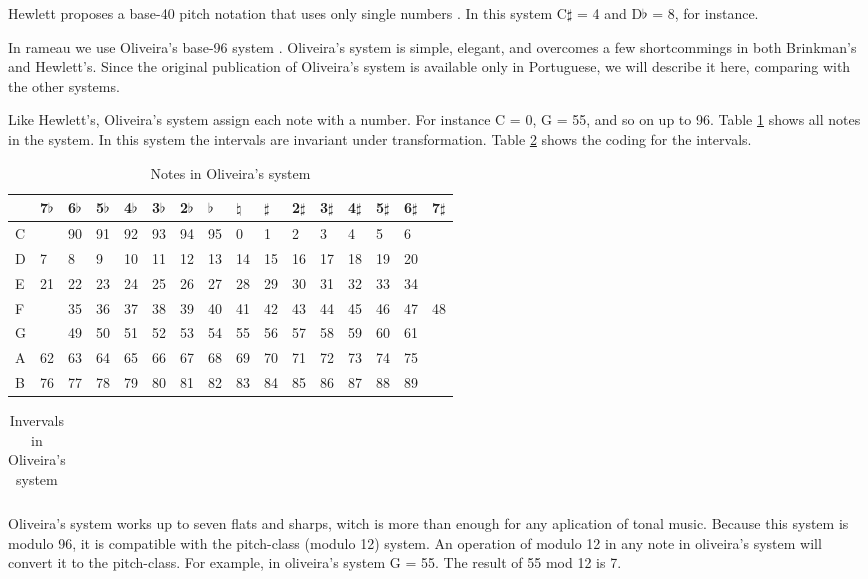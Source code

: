 \documentclass{article}
\begin{document}
Hewlett proposes a base-40 pitch notation that uses only single
numbers \cite{hewlett92:base40}. In this system C$\sharp$ = 4 and
D$\flat$ = 8, for instance.

In rameau we use Oliveira's base-96 system
\cite{oliveira01:codificacao}. Oliveira's system is simple, elegant,
and overcomes a few shortcommings in both Brinkman's and Hewlett's.
Since the original publication of Oliveira's system is available only
in Portuguese, we will describe it here, comparing with the other
systems.

Like Hewlett's, Oliveira's system assign each note with a number. For
instance C = 0, G = 55, and so on up to 96. Table
\ref{tab:jama-notas} shows all notes in the system. In this system the
intervals are invariant under transformation. Table
\ref{tab:jama-intervalos} shows the coding for the intervals.

\begin{table}
  \centering
  \begin{tabular}{l|lllllllllllllll}
    & 7$\flat$ & 6$\flat$ & 5$\flat$ & 4$\flat$ & 3$\flat$ & 2$\flat$ &
    $\flat$ & 
    $\natural$ & $\sharp$ & 2$\sharp$ & 3$\sharp$ & 4$\sharp$ &
    5$\sharp$ & 6$\sharp$ & 7$\sharp$ \\
    \hline
    C &   &90&91&92&93&94&95& 0& 1& 2& 3& 4& 5& 6& \\
    D &  7& 8& 9&10&11&12&13&14&15&16&17&18&19&20& \\
    E & 21&22&23&24&25&26&27&28&29&30&31&32&33&34 \\
    F &   &35&36&37&38&39&40&41&42&43&44&45&46&47&48 \\
    G &   &49&50&51&52&53&54&55&56&57&58&59&60&61& \\
    A & 62&63&64&65&66&67&68&69&70&71&72&73&74&75& \\
    B & 76&77&78&79&80&81&82&83&84&85&86&87&88&89& \\
  \end{tabular}
  \caption{Notes in Oliveira's system}
  \label{tab:jama-notas}
\end{table}

\begin{table}
  \centering
  \begin{tabular}{llllllllllllllll}
    
  \end{tabular}
  \caption{Invervals in Oliveira's system}
  \label{tab:jama-intervalos}
\end{table}

Oliveira's system works up to seven flats and sharps, witch is more
than enough for any aplication of tonal music. Because this system is
modulo 96, it is compatible with the pitch-class (modulo 12) system.
An operation of modulo 12 in any note in oliveira's system will
convert it to the pitch-class. For example, in oliveira's system G =
55. The result of 55 mod 12 is 7.
\end{document}
